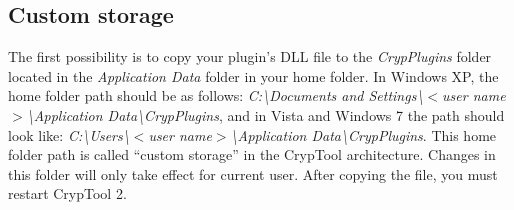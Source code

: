 





\subsection{Custom storage}
\label{sec:CustomStorage}

The first possibility is to copy your plugin's DLL file to the \textit{CrypPlugins} folder located in the \textit{Application Data} folder in your home folder. In Windows XP, the home folder path should be as follows: \textit{C:\textbackslash Documents and Settings\textbackslash $<$user name$>$\textbackslash Application Data\textbackslash CrypPlugins}, and in Vista and Windows 7 the path should look like: \textit{C:\textbackslash Users\textbackslash $<$user name$>$\textbackslash Application Data\textbackslash CrypPlugins}. This home folder path is called ``custom storage'' in the CrypTool architecture. Changes in this folder will only take effect for current user. After copying the file, you must restart CrypTool 2.

